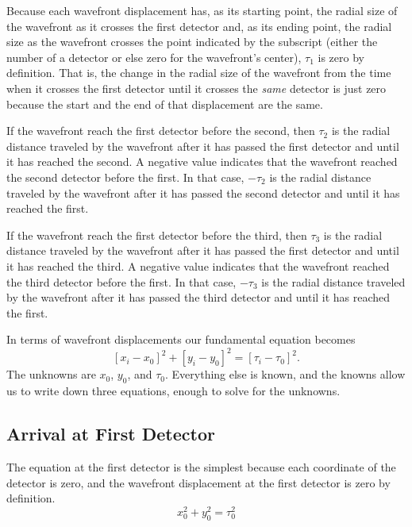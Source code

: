 \documentclass[twocolumn]{article}
\begin{document}
Because each wavefront displacement has, as its starting point, the radial size
of the wavefront as it crosses the first detector and, as its ending point, the
radial size as the wavefront crosses the point indicated by the subscript
(either the number of a detector or else zero for the wavefront's center),
$\tau_1$ is zero by definition.  That is, the change in the radial size of the
wavefront from the time when it crosses the first detector until it crosses the
\emph{same} detector is just zero because the start and the end of that
displacement are the same.

If the wavefront reach the first detector before the second, then $\tau_2$ is
the radial distance traveled by the wavefront after it has passed the first
detector and until it has reached the second.  A negative value indicates that
the wavefront reached the second detector before the first.  In that case,
$-\tau_2$ is the radial distance traveled by the wavefront after it has passed
the second detector and until it has reached the first.

If the wavefront reach the first detector before the third, then $\tau_3$ is
the radial distance traveled by the wavefront after it has passed the first
detector and until it has reached the third.  A negative value indicates that
the wavefront reached the third detector before the first.  In that case,
$-\tau_3$ is the radial distance traveled by the wavefront after it has passed
the third detector and until it has reached the first.

In terms of wavefront displacements our fundamental equation becomes
\begin{equation}
   \left[x_i - x_0\right]^2 + \left[y_i - y_0\right]^2 = \left[\tau_i -
   \tau_0\right]^2.
\end{equation}
The unknowns are $x_0$, $y_0$, and $\tau_0$. Everything else is known, and the
knowns allow us to write down three equations, enough to solve for the
unknowns.

\subsection{Arrival at First Detector}

The equation at the first detector is the simplest because each coordinate of
the detector is zero, and the wavefront displacement at the first detector is
zero by definition.
\begin{equation}
   x_0^2 + y_0^2 = \tau_0^2
   \label{eq:first}
\end{equation}
\end{document}
